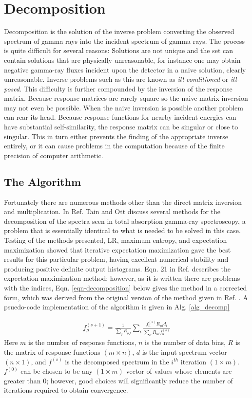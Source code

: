 \documentclass[5p]{elsarticle}
\begin{document}
\section{Decomposition}
Decomposition is the solution of the inverse problem converting the observed spectrum of gamma rays into the incident spectrum of gamma rays. The process is quite difficult for several reasons: Solutions are not unique and the set can contain solutions that are physically unreasonable, for instance one may obtain negative gamma-ray fluxes incident upon the detector in a naive solution, clearly unreasonable. Inverse problems such as this are known as \emph{ill-conditioned} or \emph{ill-posed}\cite{TainOtt2007}. This difficulty is further compounded by the inversion of the response matrix. Because response matrices are rarely square so the naive matrix inversion may not even be possible. When the naive inversion is possible another problem can rear its head. Because response functions for nearby incident energies can have substantial self-similarity, the response matrix can be singular or close to singular. This in turn either prevents the finding of the appropriate inverse entirely, or it can cause problems in the computation because of the finite precision of computer arithmetic.

\subsection{The Algorithm}
Fortunately there are numerous methods other than the direct matrix inversion and multiplication. In Ref. \cite{TainOtt2007} Tain and Ott discuss several methods for the decomposition of the spectra seen in total absorption gamma-ray spectroscopy, a problem that is essentially identical to what is needed to be solved in this case. Testing of the methods presented, LR, maximum entropy, and expectation maximization showed that iterative expectation maximization gave the best results for this particular problem, having excellent numerical stability and producing positive definite output histograms. Eqn. 21 in Ref. \cite{TainOtt2007} describes the expectation maximization method; however, as it is written there are problems with the indices, Eqn. \ref{eqn-decomposition} below gives the method in a corrected form, which was derived from the original version of the method given in Ref. \cite{lucyAstro1974}. A psuedo-code implementation of the algorithm is given in Alg. \ref{alg_decomp}

\begin{align}
f_{\mu}^{(s+1)} = \frac{1}{\sum\limits_{j}R_{\mu{}j}} \sum\limits_{i}\frac{f_{\mu{}}^{(s)} R_{\mu{}i}d_i}{\sum\limits_{\alpha}R_{\alpha{}i}f_{\alpha}^{(s)}}
\label{eqn-decomposition}
\end{align}
Here $m$ is the number of response functions, $n$ is the number of data bins, $R$ is the matrix of response functions $(m \times n)$, $d$ is the input spectrum vector $(n \times 1)$, and $f^{(s)}$ is the decomposed spectrum in the $i^{th}$ iteration $(1 \times m)$. $f^{(0)}$ can be chosen to be any $(1 \times m)$ vector of values whose elements are greater than 0; however, good choices will significantly reduce the number of iterations required to obtain convergence.
\end{document}
